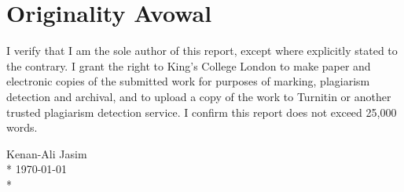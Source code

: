 	\chapter*{Originality Avowal}
  	\begin{center}
                        \begin{flushleft}
			I verify that I am the sole author of this report, except where explicitly stated to the contrary.
			I grant the right to King's College London to make paper and electronic copies of the submitted work for purposes of marking, plagiarism detection and archival, and to upload a copy of the work to Turnitin or another trusted plagiarism detection service. I confirm this report does not exceed 25,000 words.\\
			\end{flushleft}
  		\begin{flushright}
        		      \normalsize{Kenan-Ali Jasim}\\*
		      \normalsize{\today}\\*
  		\end{flushright}
  	\end{center}